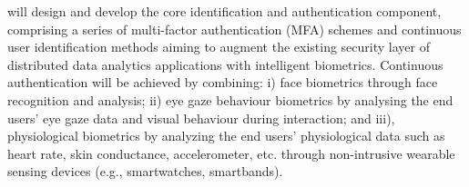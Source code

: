 \begin{Workpackage}{\thewpno}
\begin{Task}
\end{Task}

\begin{Task}
\TaskResults{%
\ref{del:auth1},
\ref{del:auth2},
\ref{del:auth3}
}
\TaskHeader{}

\theTask{} will design and develop the core identification and authentication component, comprising a series of multi-factor authentication (MFA) schemes and continuous user identification methods aiming to augment the existing security layer of distributed data analytics applications with intelligent biometrics. Continuous authentication will be achieved by combining: i) face biometrics through face recognition and analysis; ii) eye gaze behaviour biometrics by analysing the end users' eye gaze data and visual behaviour during interaction; and iii), physiological biometrics by analyzing the end users' physiological data such as heart rate, skin conductance, accelerometer, etc. through non-intrusive wearable sensing devices (e.g., smartwatches, smartbands). 
\taskbreak

\end{Task}
\end{Workpackage}
